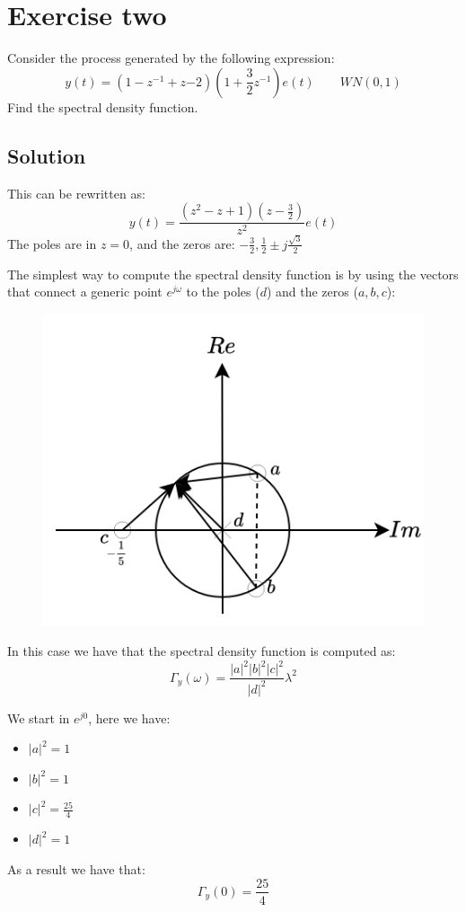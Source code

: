 \section{Exercise two}

Consider the process generated by the following expression: 
\[y(t)=\left( 1-z^{-1}+z{-2} \right)\left( 1+\dfrac{3}{2}z^{-1}\right)e(t)\qquad WN(0,1)\]
Find the spectral density function. 

\subsection{Solution}
This can be rewritten as: 
\[y(t)=\dfrac{\left(z^2-z+1\right)\left( z-\frac{3}{2} \right)}{z^2}e(t)\]
The poles are in $z=0$, and the zeros are: $-\frac{3}{2},\frac{1}{2}\pm j\frac{\sqrt{3}}{2}$

The simplest way to compute the spectral density function is by using the vectors that connect a generic point $e^{j\omega}$ to the poles ($d$) and the zeros ($a,b,c$): 
\begin{figure}[H]
    \centering
    \includegraphics[width=0.5\linewidth]{images/spec1.png}
\end{figure}
In this case we have that the spectral density function is computed as: 
\[\Gamma_y(\omega)=\dfrac{\left\lvert a \right\rvert^2\left\lvert b \right\rvert^2\left\lvert c \right\rvert^2}{\left\lvert d \right\rvert^2}\lambda^2\]

We start in $e^{j0}$, here we have: 
\begin{itemize}
    \item $\left\lvert a \right\rvert^2=1$
    \item $\left\lvert b \right\rvert^2=1$
    \item $\left\lvert c \right\rvert^2=\frac{25}{4}$
    \item $\left\lvert d \right\rvert^2=1$
\end{itemize}
As a result we have that: 
\[\Gamma_y(0)=\dfrac{25}{4}\]


